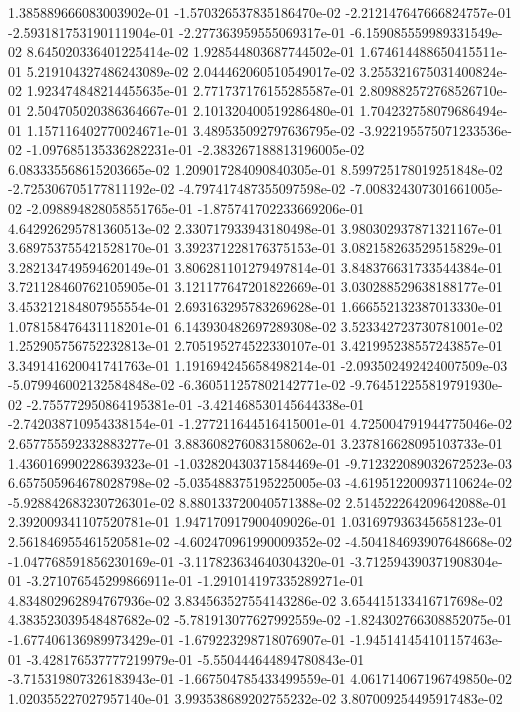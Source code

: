 1.385889666083003902e-01
-1.570326537835186470e-02
-2.212147647666824757e-01
-2.593181753190111904e-01
-2.277363959555069317e-01
-6.159085559989331549e-02
8.645020336401225414e-02
1.928544803687744502e-01
1.674614488650415511e-01
5.219104327486243089e-02
2.044462060510549017e-02
3.255321675031400824e-02
1.923474848214455635e-01
2.771737176155285587e-01
2.809882572768526710e-01
2.504705020386364667e-01
2.101320400519286480e-01
1.704232758079686494e-01
1.157116402770024671e-01
3.489535092797636795e-02
-3.922195575071233536e-02
-1.097685135336282231e-01
-2.383267188813196005e-02
6.083335568615203665e-02
1.209017284090840305e-01
8.599725178019251848e-02
-2.725306705177811192e-02
-4.797417487355097598e-02
-7.008324307301661005e-02
-2.098894828058551765e-01
-1.875741702233669206e-01
4.642926295781360513e-02
2.330717933943180498e-01
3.980302937871321167e-01
3.689753755421528170e-01
3.392371228176375153e-01
3.082158263529515829e-01
3.282134749594620149e-01
3.806281101279497814e-01
3.848376631733544384e-01
3.721128460762105905e-01
3.121177647201822669e-01
3.030288529638188177e-01
3.453212184807955554e-01
2.693163295783269628e-01
1.666552132387013330e-01
1.078158476431118201e-01
6.143930482697289308e-02
3.523342723730781001e-02
1.252905756752232813e-01
2.705195274522330107e-01
3.421995238557243857e-01
3.349141620041741763e-01
1.191694245658498214e-01
-2.093502492424007509e-03
-5.079946002132584848e-02
-6.360511257802142771e-02
-9.764512255819791930e-02
-2.755772950864195381e-01
-3.421468530145644338e-01
-2.742038710954338154e-01
-1.277211644516415001e-01
4.725004791944775046e-02
2.657755592332883277e-01
3.883608276083158062e-01
3.237816628095103733e-01
1.436016990228639323e-01
-1.032820430371584469e-01
-9.712322089032672523e-03
6.657505964678028798e-02
-5.035488375195225005e-03
-4.619512200937110624e-02
-5.928842683230726301e-02
8.880133720040571388e-02
2.514522264209642088e-01
2.392009341107520781e-01
1.947170917900409026e-01
1.031697936345658123e-01
2.561846955461520581e-02
-4.602470961990009352e-02
-4.504184693907648668e-02
-1.047768591856230169e-01
-3.117823634640304320e-01
-3.712594390371908304e-01
-3.271076545299866911e-01
-1.291014197335289271e-01
4.834802962894767936e-02
3.834563527554143286e-02
3.654415133416717698e-02
4.383523039548487682e-02
-5.781913077627992559e-02
-1.824302766308852075e-01
-1.677406136989973429e-01
-1.679223298718076907e-01
-1.945141454101157463e-01
-3.428176537777219979e-01
-5.550444644894780843e-01
-3.715319807326183943e-01
-1.667504785433499559e-01
4.061714067196749850e-02
1.020355227027957140e-01
3.993538689202755232e-02
3.807009254495917483e-02

